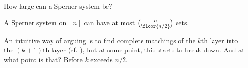 How large can a Sperner system be?

\begin{boxtheorem}
    A Sperner system on $[n]$ can have at most $\binom{n}{\floor{n/2}}$ sets.
\end{boxtheorem}

An intuitive way of arguing is to find complete matchings of the $k$th layer into the $(k + 1)$th layer (cf. ), but at some point, this starts to break down. And at what point is that? Before $k$ exceeds $n / 2$.

